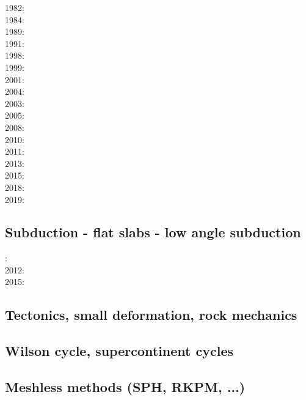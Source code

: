 1982: \cite{clwv82}\\
1984: \cite{cade84}\\
1989: \cite{clwv89}\\
1991: \cite{muph91}\\
1998: \cite{togu98}\\
1999: \cite{fagd99}\\
2001: \cite{dohe01}\cite{reyb01}\cite{brry01}\\
2004: \cite{ster04}\cite{guhl04}\\
2003: \cite{hags03}\\
2005: \cite{bihi05}\\
2008: \cite{uegs08}\\
2010: \cite{nigm10}\cite{bucl10}\\
2011: \cite{bagw11}\\
2013: \cite{dyge13}\\
2015: \cite{matv15}\cite{pebu15}\cite{vapm15}\\
2018: \cite{zhlg18}\\
2019: \cite{begb19}\cite{gubg19}

\subsection*{Subduction - flat slabs - low angle subduction}

: \cite{cube11}\\
2012: \cite{mapm12}\\
2015: \cite{gehm15}

\subsection*{Tectonics, small deformation, rock mechanics}

\cite{ilma93}
\cite{hept96}
\cite{esfm08}
\cite{lega12}

\subsection*{Wilson cycle, supercontinent cycles}

\cite{trry95}
\cite{zhzl07}
\cite{zhzm09}
\cite{begb19}


\subsection*{Meshless methods (SPH, RKPM, ...)}

\cite{febh05}
\cite{nifs15}




